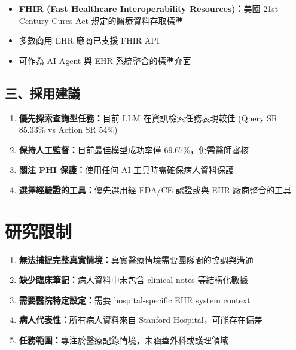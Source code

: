 \documentclass[12pt,a4paper]{article}
\begin{document}
\begin{tcolorbox}[colback=emergency_blue!5!white,colframe=emergency_blue,title=\textbf{實用工具與建議}]
\begin{itemize}
    \item \textbf{FHIR (Fast Healthcare Interoperability Resources)：}美國 21st Century Cures Act 規定的醫療資料存取標準
    \item 多數商用 EHR 廠商已支援 FHIR API
    \item 可作為 AI Agent 與 EHR 系統整合的標準介面
\end{itemize}

\subsection*{三、採用建議}

\begin{enumerate}
    \item \textbf{優先探索查詢型任務：}目前 LLM 在資訊檢索任務表現較佳 (Query SR 85.33\% vs Action SR 54\%)
    \item \textbf{保持人工監督：}目前最佳模型成功率僅 69.67\%，仍需醫師審核
    \item \textbf{關注 PHI 保護：}使用任何 AI 工具時需確保病人資料保護
    \item \textbf{選擇經驗證的工具：}優先選用經 FDA/CE 認證或與 EHR 廠商整合的工具
\end{enumerate}

\end{tcolorbox}

\section{研究限制}

\begin{enumerate}
    \item \textbf{無法捕捉完整真實情境：}真實醫療情境需要團隊間的協調與溝通
    \item \textbf{缺少臨床筆記：}病人資料中未包含 clinical notes 等結構化數據
    \item \textbf{需要醫院特定設定：}需要 hospital-specific EHR system context
    \item \textbf{病人代表性：}所有病人資料來自 Stanford Hospital，可能存在偏差
    \item \textbf{任務範圍：}專注於醫療記錄情境，未涵蓋外科或護理領域
\end{enumerate}

\end{document}
